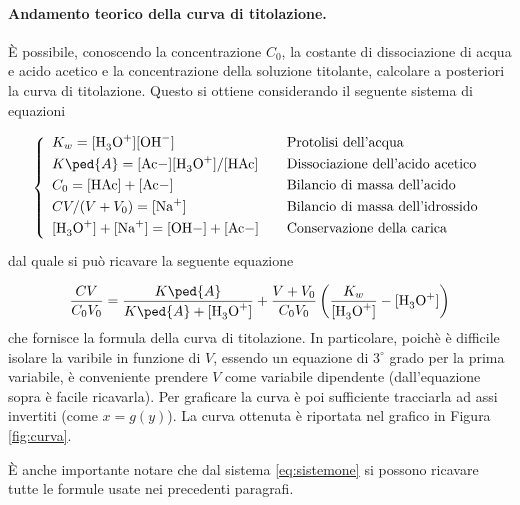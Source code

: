 \paragraph{Andamento teorico della curva di titolazione.}

È possibile, conoscendo la concentrazione $C_0$, la costante di dissociazione di
acqua e acido acetico e la concentrazione della soluzione titolante,
calcolare a posteriori la curva di titolazione.
Questo si ottiene considerando il seguente sistema di equazioni

\begin{equation}
    \left\{
    \begin{array}{l @\qquad l} \smallskip
        K_w = [\ce{H3O+}][\ce{OH-}] & \text{Protolisi dell'acqua} \\ \smallskip
        K\ped{A} = [\ce{Ac-]}[\ce{H3O+}]/[\ce{HAc}] & \text{Dissociazione dell'acido acetico} \\ \smallskip
        C_0 = \ce{[HAc] + [Ac-]} & \text{Bilancio di massa dell'acido} \\ \smallskip
        CV/(V + V_0) = [\ce{Na+}] & \text{Bilancio di massa dell'idrossido} \\ \smallskip
        \ce{[H3O+] + [Na+] = [OH-] + [Ac-]} & \text{Conservazione della carica} \\
    \end{array}
    \right.
    \label{eq:sistemone}
\end{equation}
%
dal quale si può ricavare la seguente equazione

\begin{equation}
    \frac{CV}{C_0V_0} = \frac{K\ped{A}}{K\ped{A} + \ce{[H3O+]}} + \frac{V + V_0}{C_0V_0} \left(\frac{K_w}{\ce{[H3O+]}} - \ce{[H3O+]} \right)
    \label{eq:curv}
\end{equation}
%
che fornisce la formula della curva di titolazione. In particolare, poichè è difficile isolare la varibile \ce{[H3O+]} in funzione di $V$, essendo
un equazione di $3^\circ$ grado per la prima variabile, è conveniente prendere $V$ come variabile dipendente 
(dall'equazione sopra è facile ricavarla). Per graficare la curva è poi sufficiente tracciarla ad assi invertiti (come $x = g(y)$).
La curva ottenuta è riportata nel grafico in Figura \ref{fig:curva}.

È anche importante notare che dal sistema \eqref{eq:sistemone} si possono ricavare tutte le formule usate nei precedenti
paragrafi.
